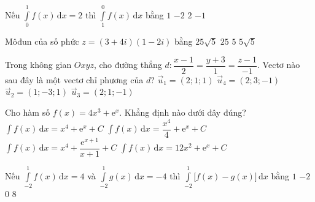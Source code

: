 \begin{ex}%
	Nếu $\displaystyle\int\limits_0^1 f(x)\mathrm{\,d}x=2$ thì $\displaystyle\int\limits_1^0 f(x)\mathrm{\,d}x$ bằng
	\choice
	{$1$}
	{\True $-2$}
	{$2$}
	{$-1$}
\end{ex}

\begin{ex}%
	Môđun của số phức $z=(3+4i)(1-2i)$ bằng
	\choice
	{$25\sqrt{5}$}
	{$25$}
	{$5$}
	{\True $5\sqrt{5}$}
\end{ex}

\begin{ex}%
	Trong không gian $Oxyz$, cho đường thẳng $d\colon \dfrac{x-1}{2}=\dfrac{y+3}{1}=\dfrac{z-1}{-1}$. Vectơ nào sau đây là một vectơ chỉ phương của $d$?
	\choice
	{$\overrightarrow{u}_1=(2;1;1)$}
	{$\overrightarrow{u}_4=(2;3;-1)$}
	{$\overrightarrow{u}_2=(1;-3;1)$}
	{\True $\overrightarrow{u}_3=(2;1;-1)$}
\end{ex}

\begin{ex}%
	Cho hàm số $f(x)=4x^3+\mathrm{e}^x$. Khẳng định nào dưới đây đúng?
	\choice
	{\True $\displaystyle\int f(x) \mathrm{\,d}x=x^4+\mathrm{e}^x+C$}
	{$\displaystyle\int f(x) \mathrm{\,d}x=\dfrac{x^4}{4}+\mathrm{e}^x+C$}
	{$\displaystyle\int f(x) \mathrm{\,d}x=x^4+\dfrac{\mathrm{e}^{x+1}}{x+1}+C$}
	{$\displaystyle\int f(x) \mathrm{\,d}x=12x^2+\mathrm{e}^x+C$}
\end{ex}

\begin{ex}%
	Nếu $\displaystyle\int\limits_{-2}^1 f(x)\mathrm{\,d}x=4$ và $\displaystyle\int\limits_{-2}^1 g(x)\mathrm{\,d}x=-4$ thì $\displaystyle\int\limits_{-2}^1\big[f(x)-g(x)\big]\mathrm{\,d}x$ bằng
	\choice
	{$1$}
	{$-2$}
	{$0$}
	{\True $8$}
\end{ex}

